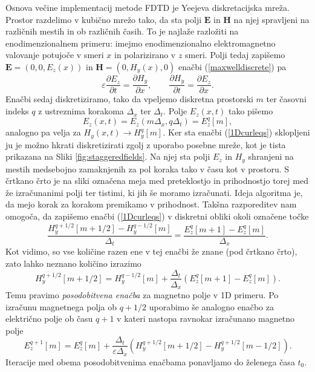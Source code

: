 \documentclass[longbibliography,slovene,a4paper,12pt]{book}
\begin{document}
Osnova večine implementacij metode FDTD je Yeejeva diskretacijska mreža. Prostor razdelimo v kubično mrežo tako, da sta polji $\mathbf{E}$ in $\mathbf{H}$ na njej spravljeni na različnih mestih in ob različnih časih. To je najlaže razložiti na enodimenzionalnem primeru: imejmo enodimenzionalno elektromagnetno valovanje potujoče v smeri $x$ in polarizirano v $z$ smeri. Polji tedaj zapišemo $\mathbf{E} = (0,0, E_z(x))$ in $\mathbf{H} = (0, H_y(x), 0)$ enačbi (\ref{maxwelldiscrete}) pa
\begin{equation}
\varepsilon \frac{\partial E_z}{\partial t}  = \frac{\partial H_y}{\partial x}, \qquad \frac{\partial H_y}{\partial t} = \frac{\partial E_z}{\partial x}.
\label{1Dcurleqs}
 \end{equation}
 Enačbi sedaj diskretiziramo, tako da vpeljemo diskretna prostorski $m$ ter časovni indeks $q$ z ustreznima korakoma $\Delta_x$ ter $\Delta_t$. Polje $E_z(x,t)$ tako pišemo
\begin{equation}
E_z(x,t) = E_z (m \Delta_x, q\Delta_t) = E_z^q [m],
\end{equation}
analogno pa velja za $H_y(x,t) \rightarrow H_y^q[m]$. Ker sta enačbi (\ref{1Dcurleqs}) sklopljeni ju je možno hkrati diskretizirati zgolj z uporabo posebne mreže, kot je tista prikazana na Sliki \ref{fig:staggeredfields}. Na njej sta polji $E_z$ in $H_y$ shranjeni na mestih medsebojno zamaknjenih za pol koraka tako v času kot v prostoru. S črtkano črto je na sliki označena meja med preteklostjo in prihodnostjo torej med že izračunanimi polji ter tistimi, ki jih še moramo izračunati. Ideja algoritma je, da mejo korak za korakom premikamo v prihodnost. Takšna razporeditev nam omogoča, da zapišemo enačbi (\ref{1Dcurleqs}) v diskretni obliki okoli označene točke
\begin{equation}
 \frac{H_y^{q+1/2}[m + 1/2] - H_y^{q-1/2}[m]}{\Delta_t} = \frac{E_z^q [m+1] - E_z^q [m]}{\Delta_x}.
\end{equation}
Kot vidimo, so vse količine razen ene v tej enačbi že znane (pod črtkano črto), zato lahko neznano količino izrazimo
\begin{equation}
H_y^{q+1/2} [m +1/2] = H_y^{q-1/2}[m] + \frac{\Delta_t}{\Delta_x} \left ( E_z^q[m+1] - E_z^q[m] \right ).
\label{updateH}
\end{equation}
Temu pravimo \emph{posodobitvena enačba} za magnetno polje v 1D primeru. Po izračunu magnetnega polja ob $q+1/2$ uporabimo še analogno enačbo za električno polje ob času $q+1$ v kateri nastopa ravnokar izračunano magnetno polje
\begin{equation}
E_z^{q+1} [m] = E_z^q [m] +\frac{\Delta_t}{\varepsilon \Delta_x}  \left (H_y^{q+1/2} [m+1/2] - H_y^{q+1/2} [m-1/2] \right ).
\label{updateE}
\end{equation}
Iteracije med obema posodobitvenima enačbama ponavljamo do želenega časa $t_0$.\\
\end{document}
